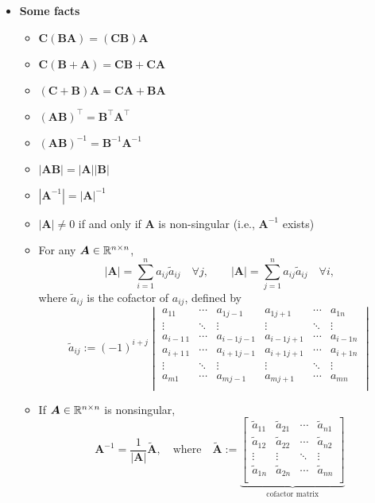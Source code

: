 \documentclass[12pt,a4paper]{article}
\begin{document}
\begin{itemize}
\item \textbf{Some facts}
  \begin{itemize}
  \item $\bm{C}(\bm{B}\bm{A}) = (\bm{C}\bm{B})\bm{A}$
  \item $\bm{C}(\bm{B}+\bm{A}) = \bm{C}\bm{B} + \bm{C}\bm{A}$
  \item $(\bm{C}+\bm{B})\bm{A} = \bm{C}\bm{A} + \bm{B}\bm{A}$
  \item $(\bm{A}\bm{B})^{\top} = \bm{B}^{\top}\bm{A}^{\top}$
  \item $(\bm{A}\bm{B})^{-1} = \bm{B}^{-1}\bm{A}^{-1}$
  \item $|\bm{A}\bm{B}| = |\bm{A}||\bm{B}|$
  \item $|\bm{A}^{-1}| = |\bm{A}|^{-1}$
  \item $|\bm{A}| \neq 0$ if and only if $\bm{A}$ is non-singular (i.e., $\bm{A}^{-1}$ exists)
  \item For any $\bm{A}\in\mathbb{R}^{n\times n}$,
    \begin{equation}\nonumber%
      |\bm{A}| = \sum_{i=1}^{n}a_{ij}\tilde{a}_{ij} \quad \forall j,
      \qquad
      |\bm{A}| = \sum_{j=1}^{n}a_{ij}\tilde{a}_{ij} \quad \forall i,
    \end{equation}
    where $\tilde{a}_{ij}$ is the cofactor of $a_{ij}$, defined by
    \begin{equation}\nonumber%
      \tilde{a}_{ij}:=
      (-1)^{i+j}
      \begin{vmatrix}
        a_{11} & \cdots & a_{1j-1} &  a_{1j+1} & \cdots & a_{1n} \\
        \vdots & \ddots & \vdots & \vdots & \ddots & \vdots \\
        a_{i-1\, 1} & \cdots & a_{i-1j-1} & a_{i-1j+1} & \cdots & a_{i-1n} \\
        a_{i+1\, 1} & \cdots & a_{i+1j-1} & a_{i+1j+1} & \cdots & a_{i+1n} \\
        \vdots & \ddots & \vdots & \vdots & \ddots & \vdots \\
        a_{m1} & \cdots & a_{mj-1} & a_{mj+1} & \cdots & a_{mn} \\
      \end{vmatrix}\nonumber
    \end{equation}
  \item If $\bm{A}\in \mathbb{R}^{n\times n}$ is nonsingular,
    \begin{equation}\nonumber%
      \bm{A}^{-1} = \frac{1}{|\bm{A}|}\tilde{\bm{A}},
      \quad\text{where}\quad
      \tilde{\bm{A}}:=
      \underbrace{
      \begin{bmatrix}
        \tilde{a}_{11} & \tilde{a}_{21} & \cdots & \tilde{a}_{n1} \\
        \tilde{a}_{12} & \tilde{a}_{22} & \cdots & \tilde{a}_{n2} \\
        \vdots & \vdots & \ddots & \vdots \\
        \tilde{a}_{1n} & \tilde{a}_{2n} & \cdots & \tilde{a}_{nn} \\
      \end{bmatrix}}_{\text{cofactor matrix}}
    \end{equation}
  \end{itemize}


\end{itemize}
\end{document}
